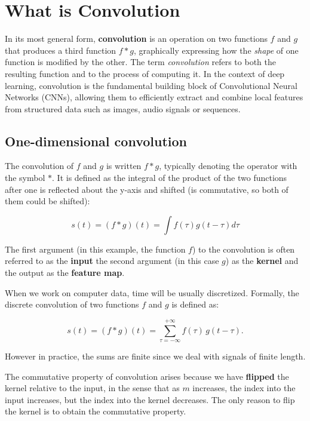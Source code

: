 \chapter{What is Convolution}
\label{ch:what-is-conv}%

In its most general form, \textbf{convolution} is an operation on two functions $f$ and $g$ that produces a third function $f*g$, graphically expressing how the \textit{shape} of one function is modified by the other. The term \textit{convolution} refers to both the resulting function and to the process of computing it. In the context of deep learning, convolution is the fundamental building block of Convolutional Neural Networks (CNNs), allowing them to efficiently extract and combine local features from structured data such as images, audio signals or sequences.

\clearpage

\section{One-dimensional convolution}

The convolution of $f$ and $g$ is written $f*g$, typically denoting the operator with the symbol $*$. It is defined as the integral of the product of the two functions after one is reflected about the y-axis and shifted (is commutative, so both of them could be shifted):

\begin{equation}
s(t)=(f * g)(t) = \int f(\tau)g(t-\tau)d\tau
\end{equation}

The first argument (in this example, the function $f$) to the convolution is often referred to as the \textbf{input} the second argument (in this case $g$) as the \textbf{kernel} and the output as the \textbf{feature map}.

When we work on computer data, time will be usually discretized. Formally, the discrete convolution of two functions $f$ and $g$ is defined as:

\begin{equation}
s(t)=(f * g)(t) = \sum_{\tau=-\infty}^{+\infty} f(\tau) \, g(t - \tau).
\end{equation}

However in practice, the sums are finite since we deal with signals of finite length.  

The commutative property of convolution arises because we have \textbf{flipped} the kernel relative to the input, in the sense that as $m$ increases, the index into the input increases, but the index into the kernel decreases. The only reason to flip the kernel is to obtain the commutative property. 

